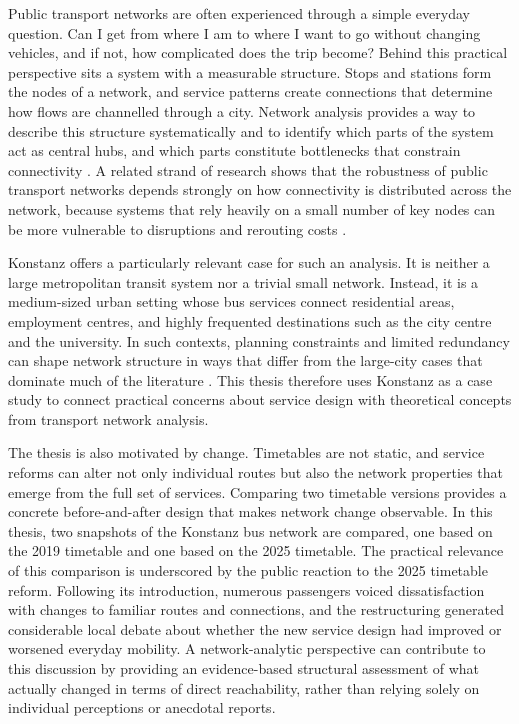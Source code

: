 \documentclass[12pt,a4paper,oneside]{report}
\begin{document}
Public transport networks are often experienced through a simple everyday question.
Can I get from where I am to where I want to go without changing vehicles, and if not, how complicated does the trip become?
Behind this practical perspective sits a system with a measurable structure.
Stops and stations form the nodes of a network, and service patterns create connections that determine how flows are channelled through a city.
Network analysis provides a way to describe this structure systematically and to identify which parts of the system act as central hubs, and which parts constitute bottlenecks that constrain connectivity \citep{barthelemy2011}.
A related strand of research shows that the robustness of public transport networks depends strongly on how connectivity is distributed across the network, because systems that rely heavily on a small number of key nodes can be more vulnerable to disruptions and rerouting costs \citep{derrible2010}.

Konstanz offers a particularly relevant case for such an analysis.
It is neither a large metropolitan transit system nor a trivial small network.
Instead, it is a medium-sized urban setting whose bus services connect residential areas, employment centres, and highly frequented destinations such as the city centre and the university.
In such contexts, planning constraints and limited redundancy can shape network structure in ways that differ from the large-city cases that dominate much of the literature \citep{cipriani2019}.
This thesis therefore uses Konstanz as a case study to connect practical concerns about service design with theoretical concepts from transport network analysis.

The thesis is also motivated by change.
Timetables are not static, and service reforms can alter not only individual routes but also the network properties that emerge from the full set of services.
Comparing two timetable versions provides a concrete before-and-after design that makes network change observable.
In this thesis, two snapshots of the Konstanz bus network are compared, one based on the 2019 timetable and one based on the 2025 timetable.
The practical relevance of this comparison is underscored by the public reaction to the 2025 timetable reform.
Following its introduction, numerous passengers voiced dissatisfaction with changes to familiar routes and connections, and the restructuring generated considerable local debate about whether the new service design had improved or worsened everyday mobility.
A network-analytic perspective can contribute to this discussion by providing an evidence-based structural assessment of what actually changed in terms of direct reachability, rather than relying solely on individual perceptions or anecdotal reports.
\end{document}
